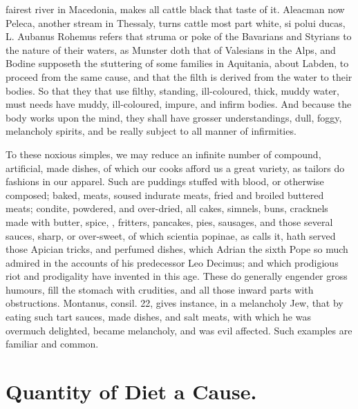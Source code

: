 {{fairest river in Macedonia, makes all cattle black that taste of it.
Aleacman now Peleca, another stream in Thessaly, turns cattle most part
white, si polui ducas, L. Aubanus Rohemus refers that struma or
poke of the Bavarians and Styrians to the nature of their waters, as
Munster doth that of Valesians in the Alps, and Bodine
supposeth the stuttering of some families in Aquitania, about Labden,
to proceed from the same cause, and that the filth is derived from the
water to their bodies. So that they that use filthy, standing,
ill-coloured, thick, muddy water, must needs have muddy, ill-coloured,
impure, and infirm bodies. And because the body works upon the mind,
they shall have grosser understandings, dull, foggy, melancholy
spirits, and be really subject to all manner of infirmities.

To these noxious simples, we may reduce an infinite number of compound,
artificial, made dishes, of which our cooks afford us a great variety,
as tailors do fashions in our apparel. Such are puddings stuffed
with blood, or otherwise composed; baked, meats, soused indurate meats,
fried and broiled buttered meats; condite, powdered, and over-dried,
all cakes, simnels, buns, cracknels made with butter, spice, \etc{},
fritters, pancakes, pies, sausages, and those several sauces, sharp, or
over-sweet, of which scientia popinae, as \Seneca calls it, hath served
those  Apician tricks, and perfumed dishes, which Adrian the
sixth Pope so much admired in the accounts of his predecessor Leo
Decimus; and which prodigious riot and prodigality have invented in
this age. These do generally engender gross humours, fill the stomach
with crudities, and all those inward parts with obstructions. Montanus,
consil. 22, gives instance, in a melancholy Jew, that by eating such
tart sauces, made dishes, and salt meats, with which he was overmuch
delighted, became melancholy, and was evil affected. Such examples are
familiar and common.

\section{Quantity of Diet a Cause.}

}}
